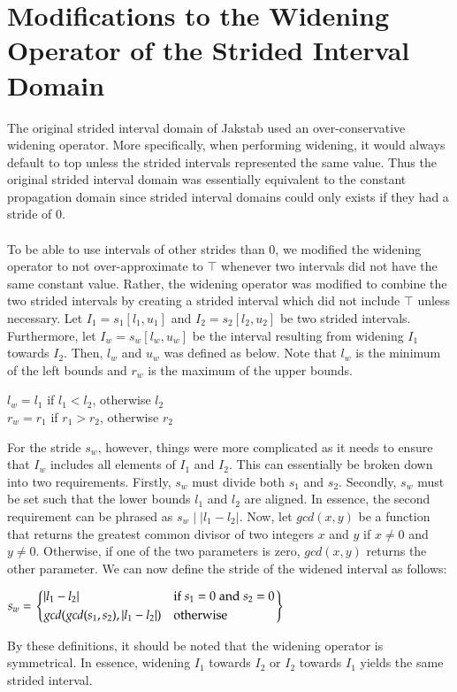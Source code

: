 \documentclass{kththesis}
\begin{document}
\clearpage
\section{Modifications to the Widening Operator of the Strided Interval Domain}
The original strided interval domain of Jakstab used an over-conservative widening operator. More specifically, when performing widening, it would always default to top unless the strided intervals represented the same value. Thus the original strided interval domain was essentially equivalent to the constant propagation domain since strided interval domains could only exists if they had a stride of $0$.
\\ \\
To be able to use intervals of other strides than $0$, we modified the widening operator to not over-approximate to $\top$ whenever two intervals did not have the same constant value. Rather, the widening operator was modified to combine the two strided intervals by creating a strided interval which did not include $\top$ unless necessary. Let $I_1=s_1[l_1,u_1]$ and $I_2=s_2[l_2,u_2]$ be two strided intervals. Furthermore, let $I_w=s_w[l_w,u_w]$ be the interval resulting from widening $I_1$ towards $I_2$. Then, $l_w$ and $u_w$ was defined as below. Note that $l_w$ is the minimum of the left bounds and $r_w$ is the maximum of the upper bounds.
\begin{center}
$l_w = l_1$ if $l_1 < l_2$, otherwise $l_2$\\
$r_w = r_1$ if $r_1 > r_2$, otherwise $r_2$
\end{center}
For the stride $s_w$, however, things were more complicated as it needs to ensure that $I_w$ includes all elements of $I_1$ and $I_2$. This can essentially be broken down into two requirements. Firstly, $s_w$ must divide both $s_1$ and $s_2$. Secondly, $s_w$ must be set such that the lower bounds $l_1$ and $l_2$ are aligned. In essence, the second requirement can be phrased as $s_w \mid \lvert l_1-l_2 \rvert$. Now, let $gcd(x,y)$ be a function that returns the greatest common divisor of two integers $x$ and $y$ if $x\neq0$ and $y\neq0$. Otherwise, if one of the two parameters is zero, $gcd(x,y)$ returns the other parameter. We can now define the stride of the widened interval as follows:
\begin{center}
 $s_w = 
\begin{rcases}
    \begin{dcases}
        \lvert l_1-l_2 \rvert & \text{if}\;s_1 = 0\; \text{and} \; s_2 = 0\\
        gcd(gcd(s_1,s_2),\lvert l_1-l_2 \rvert) & \text{otherwise}
    \end{dcases}
\end{rcases}
$
\end{center}
By these definitions, it should be noted that the widening operator is symmetrical. In essence, widening $I_1$ towards $I_2$ or $I_2$ towards $I_1$ yields the same strided interval.
\end{document}
